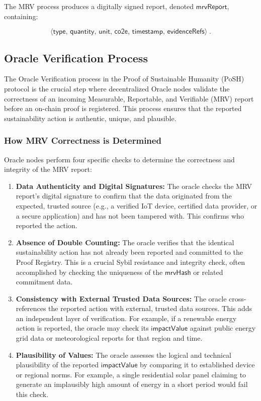 \documentclass[11pt,a4paper]{report}
\theoremstyle{definition}
\theoremstyle{remark}
\begin{document}
The MRV process produces a digitally signed report, denoted
\(\mathsf{mrvReport}\), containing:

\[
\langle \mathsf{type},\, \mathsf{quantity},\, \mathsf{unit},\, \mathsf{co2e},\,
\mathsf{timestamp},\, \mathsf{evidenceRefs} \rangle \; .
\]

\subsection{Oracle Verification Process}

The Oracle Verification process in the Proof of Sustainable Humanity (PoSH) protocol is the crucial step where decentralized Oracle nodes validate the correctness of an incoming Measurable, Reportable, and Verifiable (MRV) report before an on-chain proof is registered. This process ensures that the reported sustainability action is authentic, unique, and plausible.

\subsubsection{How MRV Correctness is Determined}

Oracle nodes perform four specific checks to determine the correctness and integrity of the MRV report:

\begin{enumerate}[label=\arabic*.,leftmargin=*]
    \item \textbf{Data Authenticity and Digital Signatures:}
    The oracle checks the MRV report's digital signature to confirm that the data originated from the expected, trusted source (e.g., a verified IoT device, certified data provider, or a secure application) and has not been tampered with. This confirms who reported the action.

    \item \textbf{Absence of Double Counting:}
    The oracle verifies that the identical sustainability action has not already been reported and committed to the Proof Registry. This is a crucial Sybil resistance and integrity check, often accomplished by checking the uniqueness of the $\mathsf{mrvHash}$ or related commitment data.

    \item \textbf{Consistency with External Trusted Data Sources:}
    The oracle cross-references the reported action with external, trusted data sources. This adds an independent layer of verification. For example, if a renewable energy action is reported, the oracle may check its $\mathsf{impactValue}$ against public energy grid data or meteorological reports for that region and time.

    \item \textbf{Plausibility of Values:}
    The oracle assesses the logical and technical plausibility of the reported $\mathsf{impactValue}$ by comparing it to established device or regional norms. For example, a single residential solar panel claiming to generate an implausibly high amount of energy in a short period would fail this check.
\end{enumerate}
\end{document}
